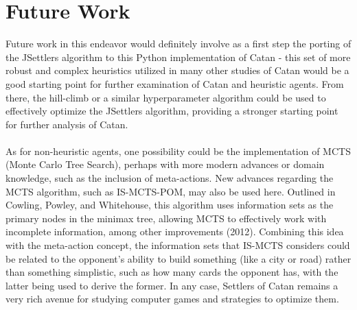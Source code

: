 \documentclass[a4paper, 11pt]{article}
\begin{document}
\section{Future Work}
Future work in this endeavor would definitely involve as a first step the porting of the JSettlers algorithm to this Python implementation of Catan - this set of more robust and complex heuristics utilized in many other studies of Catan would be a good starting point for further examination of Catan and heuristic agents. From there, the hill-climb or a similar hyperparameter algorithm could be used to effectively optimize the JSettlers algorithm, providing a stronger starting point for further analysis of Catan.
\\ \\
\noindent As for non-heuristic agents, one possibility could be the implementation of MCTS (Monte Carlo Tree Search), perhaps with more modern advances or domain knowledge, such as the inclusion of meta-actions. New advances regarding the MCTS algorithm, such as IS-MCTS-POM, may also be used here. Outlined in Cowling, Powley, and Whitehouse, this algorithm uses information sets as the primary nodes in the minimax tree, allowing MCTS to effectively work with incomplete information, among other improvements (2012). Combining this idea with the meta-action concept, the information sets that IS-MCTS considers could be related to the opponent's ability to build something (like a city or road) rather than something simplistic, such as how many cards the opponent has, with the latter being used to derive the former. In any case, Settlers of Catan remains a very rich avenue for studying computer games and strategies to optimize them.

\clearpage

\nocite{*}

\end{document}
